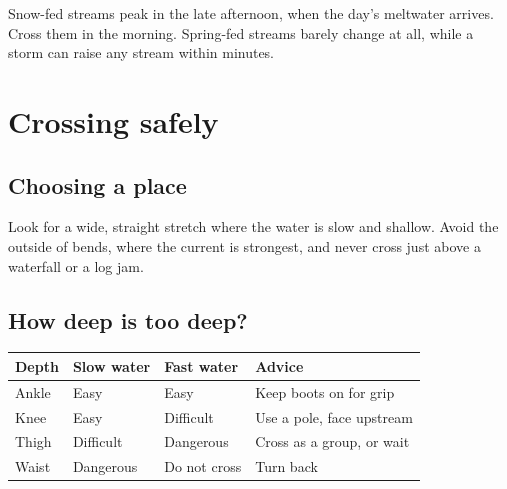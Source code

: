\documentclass[11pt]{article}
\begin{document}
\begin{center}
\end{center}

Snow-fed streams peak in the late afternoon, when the day's meltwater arrives.
Cross them in the morning. Spring-fed streams barely change at all, while a
storm can raise any stream within minutes.

\section{Crossing safely}

\subsection{Choosing a place}

Look for a wide, straight stretch where the water is slow and shallow. Avoid the
outside of bends, where the current is strongest, and never cross just above a
waterfall or a log jam.

\subsection{How deep is too deep?}

\begin{center}
\begin{tabular}{@{}llll@{}}
\toprule
Depth & Slow water & Fast water & Advice \\
\midrule
Ankle & Easy & Easy & Keep boots on for grip \\
Knee & Easy & Difficult & Use a pole, face upstream \\
Thigh & Difficult & Dangerous & Cross as a group, or wait \\
Waist & Dangerous & Do not cross & Turn back \\
\bottomrule
\end{tabular}
\end{center}
\end{document}
